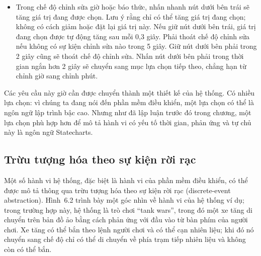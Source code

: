 \begin{itemize}
\item Trong chế độ chỉnh sửa giờ hoặc báo thức, nhấn nhanh nút dưới bên trái sẽ tăng giá trị đang được chọn. Lưu ý rằng chỉ có thể tăng giá trị đang chọn; không có cách giảm hoặc đặt lại giá trị này. Nếu giữ nút dưới bên trái, giá trị đang chọn được tự động tăng sau mỗi 0,3 giây. Phải thoát chế độ chỉnh sửa nếu không có sự kiện chỉnh sửa nào trong 5 giây. Giữ nút dưới bên phải trong 2 giây cũng sẽ thoát chế độ chỉnh sửa. Nhấn nút dưới bên phải trong thời gian ngắn hơn 2 giây sẽ chuyển sang mục lựa chọn tiếp theo, chẳng hạn từ chỉnh giờ sang chỉnh phút.
\end{itemize}

Các yêu cầu này giờ cần được chuyển thành một thiết kế của hệ thống. Có nhiều lựa chọn: vì chúng ta đang nói đến phần mềm điều khiển, một lựa chọn có thể là ngôn ngữ lập trình bậc cao. Nhưng như đã lập luận
trước đó trong chương, một lựa chọn phù hợp hơn để mô tả hành vi có yếu tố thời gian, phản ứng và tự chủ này là ngôn ngữ Statecharts.


\subsection{Trừu tượng hóa theo sự kiện rời rạc}
Một số hành vi hệ thống, đặc biệt là hành vi của phần mềm điều khiển, có thể được mô tả thông qua trừu tượng hóa theo sự kiện rời rạc (discrete-event abstraction). Hình~6.2 trình bày một góc nhìn về hành vi của hệ thống ví dụ; trong trường hợp này, hệ thống là trò chơi ``tank wars'', trong đó một xe tăng di chuyển trên bản đồ ảo bằng cách phản ứng với đầu vào từ bàn phím của người chơi. Xe tăng có thể bắn theo lệnh người chơi và có thể cạn nhiên liệu; khi đó nó chuyển sang chế độ chỉ có thể di chuyển về phía trạm tiếp nhiên liệu và không còn có thể bắn.

